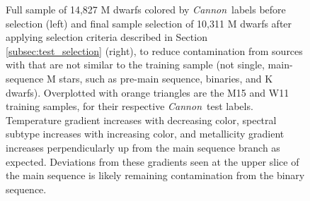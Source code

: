 \documentclass[twocolumn]{aastex62}
\newcommand{\cannon}{\textsl{Cannon}}
\begin{document}


\begin{figure}[h]
	\caption{Full sample of 14,827 M dwarfs colored by \cannon\ labels before selection (left) and final sample selection of 10,311 M dwarfs after applying selection criteria described in Section \ref{subsec:test_selection} (right), to reduce contamination from sources with that are not similar to the training sample (not single, main-sequence M stars, such as pre-main sequence, binaries, and K dwarfs). Overplotted with orange triangles are the M15 and W11 training samples, for their respective \cannon\ test labels. Temperature gradient increases with decreasing color, spectral subtype increases with increasing color, and metallicity gradient increases perpendicularly up from the main sequence branch as expected. Deviations from these gradients seen at the upper slice of the main sequence is likely remaining contamination from the binary sequence.}
	\label{fig:safe_selection}
\end{figure}
\end{document}
